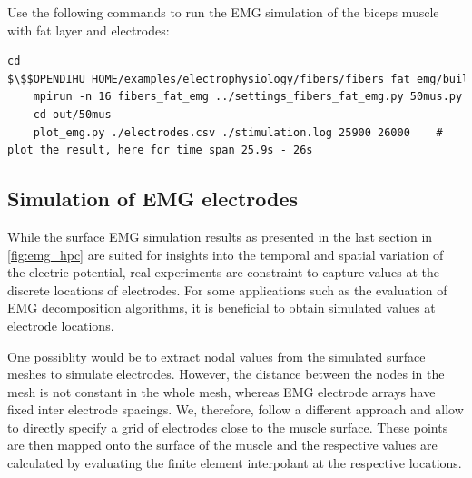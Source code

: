 %

\begin{reproduce_no_break}
  Use the following commands to run the EMG simulation of the biceps muscle with fat layer and electrodes:
  \begin{lstlisting}[columns=fullflexible,breaklines=true,postbreak=\mbox{\textcolor{gray}{$\hookrightarrow$}\space}]
    cd $\$$OPENDIHU_HOME/examples/electrophysiology/fibers/fibers_fat_emg/build_release
    mpirun -n 16 fibers_fat_emg ../settings_fibers_fat_emg.py 50mus.py
    cd out/50mus
    plot_emg.py ./electrodes.csv ./stimulation.log 25900 26000    # plot the result, here for time span 25.9s - 26s
  \end{lstlisting}
\end{reproduce_no_break}

\subsection{Simulation of EMG electrodes}\label{sec:simfiber_electrodes}

While the surface EMG simulation results as presented in the last section in \cref{fig:emg_hpc} are suited for insights into the temporal and spatial variation of the electric potential, real experiments are constraint to capture values at the discrete locations of electrodes.
For some applications such as the evaluation of EMG decomposition algorithms, it is beneficial to obtain simulated values at electrode locations.

One possiblity would be to extract nodal values from the simulated surface meshes to simulate electrodes. However, the distance between the nodes in the mesh is not constant in the whole mesh, whereas EMG electrode arrays have fixed inter electrode spacings. We, therefore, follow a different approach and allow to directly specify a grid of electrodes close to the muscle surface. These points are then mapped onto the surface of the muscle and the respective values are calculated by evaluating the finite element interpolant at the respective locations.

